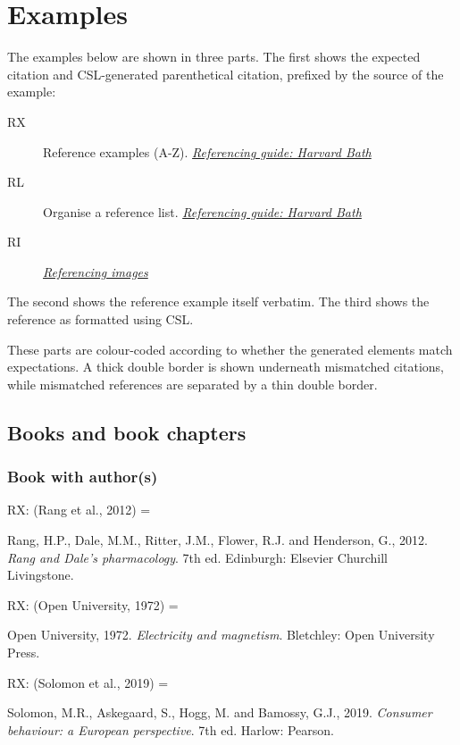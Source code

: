\frenchspacing

\section{Examples}

The examples below are shown in three parts.
The first shows the expected citation and CSL-generated parenthetical citation, prefixed by the source of the example:
\begin{description}
\item[RX]
  Reference examples (A-Z).
  \href{https://library.bath.ac.uk/referencing/harvard-bath}{\emph{Referencing guide: Harvard Bath}}
\item[RL]
  Organise a reference list.
  \href{https://library.bath.ac.uk/referencing/harvard-bath}{\emph{Referencing guide: Harvard Bath}}
\item[RI]
  \href{https://library.bath.ac.uk/images/referencing}{\emph{Referencing images}}
\end{description}
The second shows the reference example itself verbatim.
The third shows the reference as formatted using CSL.

These parts are colour-coded according to whether the generated elements match expectations.
A thick double border is shown underneath mismatched citations,
while mismatched references are separated by a thin double border.

\subsection{Books and book chapters}

\subsubsection*{Book with author(s)}

RX: (Rang et al., 2012) = \cite{rang.etal2012rdp}

Rang, H.P., Dale, M.M., Ritter, J.M., Flower, R.J. and Henderson, G., 2012. \emph{Rang and Dale's pharmacology}. 7th ed. Edinburgh: Elsevier Churchill Livingstone.


RX: (Open University, 1972) = \cite{ou1972em}

Open University, 1972. \emph{Electricity and magnetism}. Bletchley: Open University Press.


RX: (Solomon et al., 2019) = \cite{solomon.etal2019cbe}

Solomon, M.R., Askegaard, S., Hogg, M. and Bamossy, G.J., 2019. \emph{Consumer behaviour: a European perspective}. 7th ed. Harlow: Pearson.



